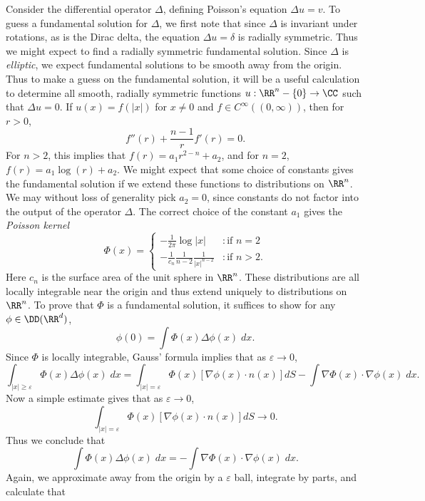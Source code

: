 \begin{example}
    Consider the differential operator $\Delta$, defining Poisson's equation $\Delta u = v$. To guess a fundamental solution for $\Delta$, we first note that since $\Delta$ is invariant under rotations, as is the Dirac delta, the equation $\Delta u = \delta$ is radially symmetric. Thus we might expect to find a radially symmetric fundamental solution. Since $\Delta$ is \emph{elliptic}, we expect fundamental solutions to be smooth away from the origin. Thus to make a guess on the fundamental solution, it will be a useful calculation to determine all smooth, radially symmetric functions $u: \RR^n - \{ 0 \} \to \CC$ such that $\Delta u = 0$. If $u(x) = f(|x|)$ for $x \neq 0$ and $f \in C^\infty((0,\infty))$, then for $r > 0$,
    \[ f''(r) + \frac{n-1}{r} f'(r) = 0. \]
    For $n > 2$, this implies that $f(r) = a_1 r^{2-n} + a_2$, and for $n = 2$, $f(r) = a_1 \log(r) + a_2$. We might expect that some choice of constants gives the fundamental solution if we extend these functions to distributions on $\RR^n$. We may without loss of generality pick $a_2 = 0$, since constants do not factor into the output of the operator $\Delta$. The correct choice of the constant $a_1$ gives the \emph{Poisson kernel}
    \[ \Phi(x) = \begin{cases} - \frac{1}{2 \pi} \log |x| &: \text{if $n = 2$} \\ - \frac{1}{c_n} \frac{1}{n-2} \frac{1}{|x|^{n-2}} &: \text{if $n > 2$.} \end{cases} \]
    Here $c_n$ is the surface area of the unit sphere in $\RR^n$. These distributions are all locally integrable near the origin and thus extend uniquely to distributions on $\RR^n$. To prove that $\Phi$ is a fundamental solution, it suffices to show for any $\phi \in \DD(\RR^d)$,
    \[ \phi(0) = \int \Phi(x) \Delta \phi(x)\; dx. \]
    Since $\Phi$ is locally integrable, Gauss' formula implies that as $\varepsilon \to 0$,
    \[ \int_{|x| \geq \varepsilon} \Phi(x) \Delta \phi(x)\; dx = \int_{|x| = \varepsilon} \Phi(x) [\nabla \phi(x) \cdot n(x)] dS - \int \nabla \Phi(x) \cdot \nabla \phi(x)\; dx. \]
    Now a simple estimate gives that as $\varepsilon \to 0$,
    \[ \int_{|x| = \varepsilon} \Phi(x) [\nabla \phi(x) \cdot n(x)] dS \to 0. \]
    Thus we conclude that
    \[ \int \Phi(x) \Delta \phi(x)\; dx = - \int \nabla \Phi(x) \cdot \nabla \phi(x)\; dx. \]
    Again, we approximate away from the origin by a $\varepsilon$ ball, integrate by parts, and calculate that

\end{example}
